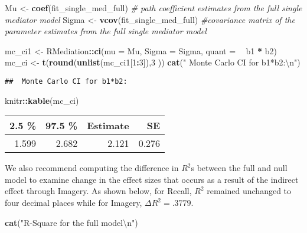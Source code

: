 \documentclass[11pt,]{article}
\newenvironment{Shaded}{\begin{snugshade}}{\end{snugshade}}
\newcommand{\CharTok}[1]{\textcolor[rgb]{0.31,0.60,0.02}{#1}}
\newcommand{\CommentTok}[1]{\textcolor[rgb]{0.56,0.35,0.01}{\textit{#1}}}
\newcommand{\DataTypeTok}[1]{\textcolor[rgb]{0.13,0.29,0.53}{#1}}
\newcommand{\DecValTok}[1]{\textcolor[rgb]{0.00,0.00,0.81}{#1}}
\newcommand{\KeywordTok}[1]{\textcolor[rgb]{0.13,0.29,0.53}{\textbf{#1}}}
\newcommand{\NormalTok}[1]{#1}
\newcommand{\OperatorTok}[1]{\textcolor[rgb]{0.81,0.36,0.00}{\textbf{#1}}}
\newcommand{\StringTok}[1]{\textcolor[rgb]{0.31,0.60,0.02}{#1}}
\begin{document}
\begin{Shaded}
\begin{Highlighting}[]
\NormalTok{Mu <-}\StringTok{ }\KeywordTok{coef}\NormalTok{(fit_single_med_full) }\CommentTok{# path coefficient estimates from the full single mediator model}
\NormalTok{Sigma <-}
\StringTok{  }\KeywordTok{vcov}\NormalTok{(fit_single_med_full) }\CommentTok{#covariance matrix of the parameter estimates from the full single mediator model}

\NormalTok{mc_ci1 <-}\StringTok{ }\NormalTok{RMediation}\OperatorTok{::}\KeywordTok{ci}\NormalTok{(}\DataTypeTok{mu =}\NormalTok{ Mu,}
                         \DataTypeTok{Sigma =}\NormalTok{ Sigma,}
                         \DataTypeTok{quant =} \OperatorTok{~}\StringTok{ }\NormalTok{b1 }\OperatorTok{*}\StringTok{ }\NormalTok{b2)}
\NormalTok{mc_ci <-}\StringTok{ }\KeywordTok{t}\NormalTok{(}\KeywordTok{round}\NormalTok{(}\KeywordTok{unlist}\NormalTok{(mc_ci1[}\DecValTok{1}\OperatorTok{:}\DecValTok{3}\NormalTok{]),}\DecValTok{3}\NormalTok{ ))}
\KeywordTok{cat}\NormalTok{(}\StringTok{" Monte Carlo CI for b1*b2:}\CharTok{\textbackslash{}n}\StringTok{"}\NormalTok{)}
\end{Highlighting}
\end{Shaded}

\begin{verbatim}
##  Monte Carlo CI for b1*b2:
\end{verbatim}

\begin{Shaded}
\begin{Highlighting}[]
\NormalTok{knitr}\OperatorTok{::}\KeywordTok{kable}\NormalTok{(mc_ci)}
\end{Highlighting}
\end{Shaded}

\begin{longtable}[]{@{}rrrr@{}}
\toprule
2.5 \% & 97.5 \% & Estimate & SE\tabularnewline
\midrule
\endhead
1.599 & 2.682 & 2.121 & 0.276\tabularnewline
\bottomrule
\end{longtable}

We also recommend computing the difference in \(R^2\)s between the full
and null model to examine change in the effect sizes that occurs as a
result of the indirect effect through Imagery. As shown below, for
Recall, \(R^2\) remained unchanged to four decimal places while for
Imagery, \(\Delta R^2 = .3779\).

\begin{Shaded}
\begin{Highlighting}[]
\KeywordTok{cat}\NormalTok{(}\StringTok{"R-Square for the full model}\CharTok{\textbackslash{}n}\StringTok{"}\NormalTok{)}
\end{Highlighting}
\end{Shaded}
\end{document}
